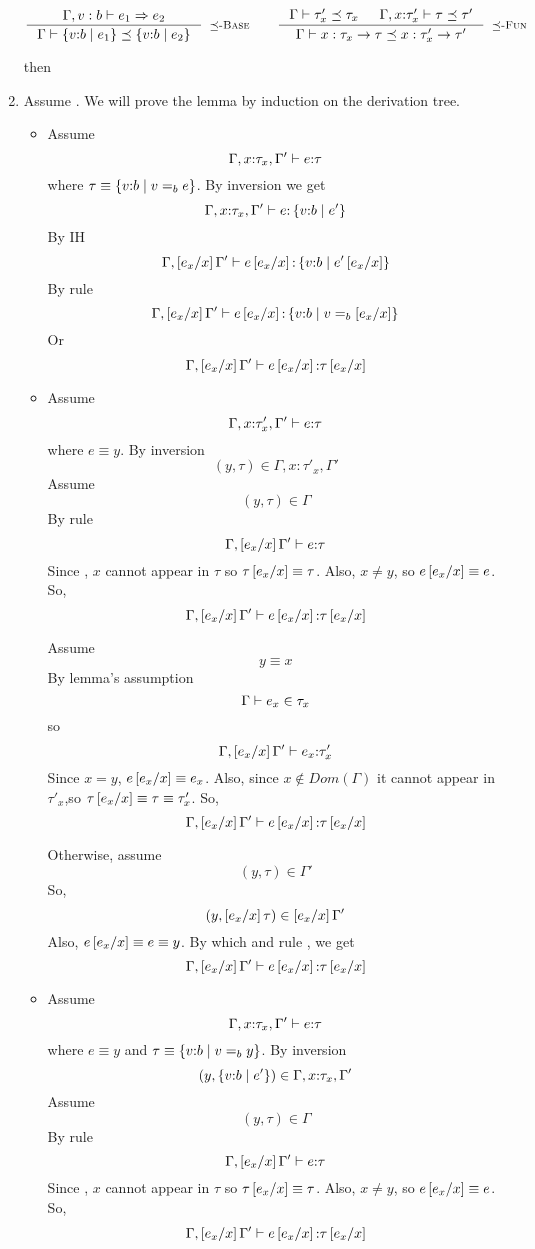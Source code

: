 \begin{enumerate}
$$
\inference{
	\issubref{\Gamma, v:b}{e_1}{e_2}
}{
	\issubtype{\Gamma}{\tref{v}{b}{e_1}}{\tref{v}{b}{e_2}}
}[\rsubbase]
\qquad
\inference{
	\issubtype{\Gamma}{\tau'_x}{\tau_x} &&
	\issubtype{\Gamma, x \colon \tau'_x}{\tau}{\tau'}
}{
	\issubtype{\Gamma}{x:\tau_x \rightarrow \tau}{x:\tau'_x \rightarrow \tau'}
}[\rsubfun]
$$

	
	then
\item \label{proof:sub:type} 
Assume 
	.
We will prove the lemma by induction on the derivation tree.
\begin{itemize}
\item \rtexact Assume
	$$\hastype{\Gamma, x\colon\tau_x, \Gamma'}{e}{\tau}$$
where $\tau \equiv \tref{v}{b}{v \eqb{b} e}$.
By inversion we get
	$$\hastype{\Gamma, x\colon\tau_x, \Gamma'}{e}{\tref{v}{b}{e'}}$$
By IH
	$$\hastype{\Gamma, \sub{x}{e_x} \Gamma'}{e\sub{x}{e_x}}{\tref{v}{b}{e'\sub{x}{e_x}}}$$
By rule \rtexact
	$$\hastype{\Gamma, \sub{x}{e_x} \Gamma'}{e\sub{x}{e_x}}{\tref{v}{b}{v \eqb{b} \sub{x}{e_x}}}$$
Or
	$$\hastype{\Gamma, \sub{x}{e_x} \Gamma'}{e\sub{x}{e_x}}{\tau\sub{x}{e_x}}$$
\item \rtvar Assume 
	$$\hastype{\Gamma, x\colon\tau'_x, \Gamma'}{e}{\tau}$$
where $e \equiv y$.
By inversion 
$$(y,\tau )\in \Gamma, x\colon\tau'_x, \Gamma'$$
Assume
$$(y,\tau)\in \Gamma$$
By rule \rtvar
$$\hastype{\Gamma,\sub{x}{e_x}\Gamma'}{e}{\tau}$$
Since \iswellformed{}{\Gamma}, $x$ cannot appear in $\tau$
so $\tau\sub{x}{e_x}\equiv\tau$.
Also, $x\neq y$, so $e\sub{x}{e_x}\equiv e$.
So,
$$\hastype{\Gamma,\sub{x}{e_x}\Gamma'}{e\sub{x}{e_x}}{\tau\sub{x}{e_x}}$$

Assume
$$y \equiv x$$
By lemma's assumption 
$$\shastype{\Gamma}{e_x}{\tau_x}$$
so
$$\hastype{\Gamma,\sub{x}{e_x}\Gamma'}{e_x}{\tau'_x}$$
Since $x = y$, $e\sub{x}{e_x} \equiv e_x$.
Also, since $x \notin Dom(\Gamma)$ 
it cannot appear in $\tau'_x$,so
$\tau\sub{x}{e_x} \equiv \tau \equiv \tau'_x$.
So,
$$\hastype{\Gamma,\sub{x}{e_x}\Gamma'}{e\sub{x}{e_x}}{\tau\sub{x}{e_x}}$$

Otherwise, assume
$$(y,\tau)\in \Gamma'$$
So,
$$(y,\sub{x}{e_x}\tau)\in \sub{x}{e_x}\Gamma'$$
Also, $e\sub{x}{e_x}\equiv e \equiv y$.
By which and rule \rtvar, we get
$$\hastype{\Gamma,\sub{x}{e_x}\Gamma'}{e\sub{x}{e_x}}{\tau\sub{x}{e_x}}$$

\item \rtvarbase
Assume 
	$$\hastype{\Gamma, x\colon\tau_x, \Gamma'}{e}{\tau}$$
where $e \equiv y$ and $\tau\equiv\tref{v}{b}{v\eqb{b} y}$.
By inversion 
$$(y,\tref{v}{b}{e'})\in \Gamma, x\colon\tau_x, \Gamma'$$
Assume
$$(y,\tau)\in \Gamma$$
By rule \rtvarbase
$$\hastype{\Gamma,\sub{x}{e_x}\Gamma'}{e}{\tau}$$
Since \iswellformed{}{\Gamma}, $x$ cannot appear in $\tau$
so $\tau\sub{x}{e_x}\equiv\tau$.
Also, $x\neq y$, so $e\sub{x}{e_x}\equiv e$.
So,
$$\hastype{\Gamma,\sub{x}{e_x}\Gamma'}{e\sub{x}{e_x}}{\tau\sub{x}{e_x}}$$


\end{itemize}
\end{enumerate}

